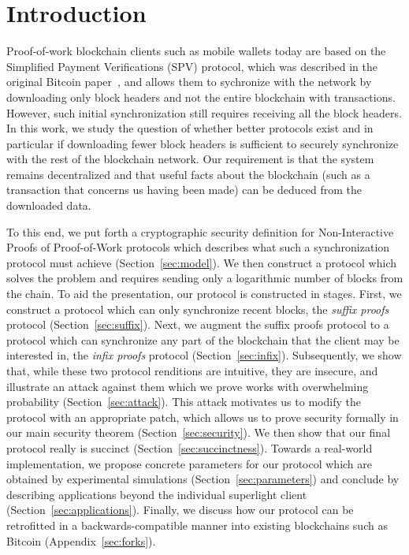 \section{Introduction}

Proof-of-work blockchain clients such as mobile wallets today are based on the
Simplified Payment Verifications (SPV) protocol, which was described in the
original Bitcoin paper~\cite{bitcoin}, and allows them to sychronize with the
network by downloading only block headers and not the entire blockchain with
transactions. However, such initial synchronization still requires receiving all
the block headers. In this work, we study the question of whether better
protocols exist and in particular if downloading fewer block headers is
sufficient to securely synchronize with the rest of the blockchain network. Our
requirement is that the system remains decentralized and that useful facts about
the blockchain (such as a transaction that concerns us having been made) can be
deduced from the downloaded data.

To this end, we put forth a cryptographic security definition for
Non-Interactive Proofs of Proof-of-Work protocols which describes what such a
synchronization protocol must achieve (Section~\ref{sec:model}). We then
construct a protocol which solves the problem and requires sending only a
logarithmic number of blocks from the chain. To aid the presentation, our
protocol is constructed in stages. First, we construct a protocol which can only
synchronize recent blocks, the \emph{suffix proofs} protocol
(Section~\ref{sec:suffix}). Next, we augment the suffix proofs protocol to a
protocol which can synchronize any part of the blockchain that the client may be
interested in, the \emph{infix proofs} protocol (Section~\ref{sec:infix}).
Subsequently, we show that, while these two protocol renditions are intuitive,
they are insecure, and illustrate an attack against them which we prove works
with overwhelming probability (Section~\ref{sec:attack}). This attack motivates
us to modify the protocol with an appropriate patch, which allows us to prove
security formally in our main security theorem (Section~\ref{sec:security}). We
then show that our final protocol really is succinct
(Section~\ref{sec:succinctness}). Towards a real-world implementation, we
propose concrete parameters for our protocol which are obtained by experimental
simulations (Section~\ref{sec:parameters}) and conclude by describing
applications beyond the individual superlight client
(Section~\ref{sec:applications}). Finally, we discuss how our protocol can be
retrofitted in a backwards-compatible manner into existing blockchains such as
Bitcoin (Appendix~\ref{sec:forks}).

